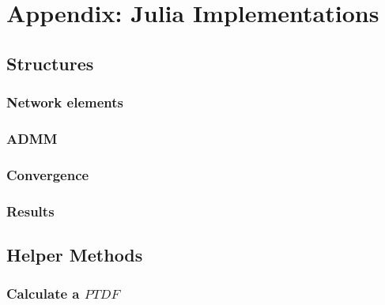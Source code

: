 \appendix				
\section{Appendix: Julia Implementations}

\subsection{Structures}

\subsubsection{Network elements}
\label{sec:appendix:jl:structures:ne}



\subsubsection{ADMM}
\label{sec:appendix:jl:structures:admm}



\subsubsection{Convergence}
\label{sec:appendix:jl:structures:convergence}



\subsubsection{Results}
\label{sec:appendix:jl:structures:results}



\subsection{Helper Methods}

\subsubsection{Calculate a $PTDF$}
\label{sec:appendix:jl:helpers:ptdf}



